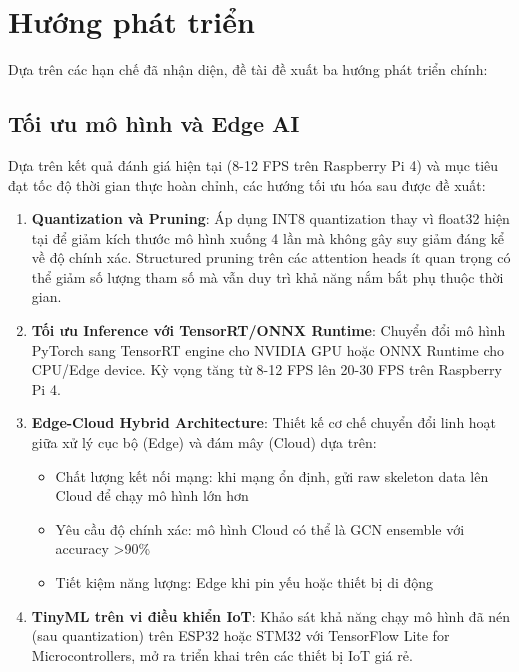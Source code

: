 \section{Hướng phát triển}
\label{sec:future_work}

Dựa trên các hạn chế đã nhận diện, đề tài đề xuất ba hướng phát triển chính:

\subsection{Tối ưu mô hình và Edge AI}
\label{sec:future_edge}

Dựa trên kết quả đánh giá hiện tại (8-12 FPS trên Raspberry Pi 4) và mục tiêu đạt tốc độ thời gian thực hoàn chỉnh, các hướng tối ưu hóa sau được đề xuất:

\begin{enumerate}
    \item \textbf{Quantization và Pruning}: Áp dụng INT8 quantization thay vì float32 hiện tại để giảm kích thước mô hình xuống 4 lần mà không gây suy giảm đáng kể về độ chính xác. Structured pruning trên các attention heads ít quan trọng có thể giảm số lượng tham số mà vẫn duy trì khả năng nắm bắt phụ thuộc thời gian.
    
    \item \textbf{Tối ưu Inference với TensorRT/ONNX Runtime}: Chuyển đổi mô hình PyTorch sang TensorRT engine cho NVIDIA GPU hoặc ONNX Runtime cho CPU/Edge device. Kỳ vọng tăng từ 8-12 FPS lên 20-30 FPS trên Raspberry Pi 4.
    
    \item \textbf{Edge-Cloud Hybrid Architecture}: Thiết kế cơ chế chuyển đổi linh hoạt giữa xử lý cục bộ (Edge) và đám mây (Cloud) dựa trên:
    \begin{itemize}
        \item Chất lượng kết nối mạng: khi mạng ổn định, gửi raw skeleton data lên Cloud để chạy mô hình lớn hơn
        \item Yêu cầu độ chính xác: mô hình Cloud có thể là GCN ensemble với accuracy >90\%
        \item Tiết kiệm năng lượng: Edge khi pin yếu hoặc thiết bị di động
    \end{itemize}
    
    \item \textbf{TinyML trên vi điều khiển IoT}: Khảo sát khả năng chạy mô hình đã nén (sau quantization) trên ESP32 hoặc STM32 với TensorFlow Lite for Microcontrollers, mở ra triển khai trên các thiết bị IoT giá rẻ.
\end{enumerate}

